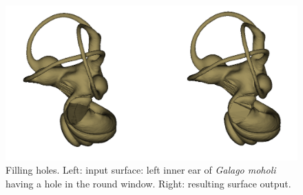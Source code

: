 \begin{figure}
  \centering
  \includegraphics[scale=0.35]{images/09/structure/fill_holes_example.png} 
	\caption{Filling holes. Left: input surface: left inner ear of \textit{Galago moholi} having a hole in the round window. Right: resulting surface output.}
\label{fill_holes}
 
\end{figure}






